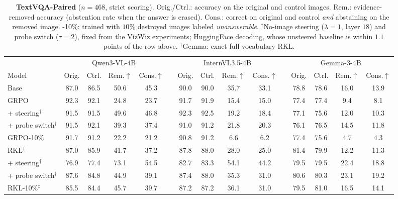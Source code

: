 \begin{table}[t]
\centering\small
\setlength{\tabcolsep}{3.2pt}
\begin{tabular}{l cccc c cccc c cccc}
\toprule
& \multicolumn{4}{c}{Qwen3-VL-4B} && \multicolumn{4}{c}{InternVL3.5-4B} && \multicolumn{4}{c}{Gemma-3-4B} \\
\cmidrule{2-5}\cmidrule{7-10}\cmidrule{12-15}
Model & Orig. & Ctrl. & Rem.$\uparrow$ & Cons.$\uparrow$ && Orig. & Ctrl. & Rem.$\uparrow$ & Cons.$\uparrow$ && Orig. & Ctrl. & Rem.$\uparrow$ & Cons.$\uparrow$ \\
\midrule
Base                     & 87.0 & 86.5 & 50.6 & 45.3 && 90.0 & 90.0 & 35.7 & 33.1 && 78.8 & 78.6 & 16.0 & 13.9 \\
\midrule
GRPO                     & 92.3 & 92.1 & 24.8 & 23.7 && 91.7 & 91.9 & 15.4 & 15.0 && 77.4 & 77.4 &  9.4 &  8.1 \\
\quad + steering$^\dagger$ & 91.5 & 91.5 & 49.6 & 46.8 && 92.3 & 92.5 & 19.2 & 18.4 && 77.1 & 75.6 & 12.0 & 10.3 \\
\quad + probe switch$^\dagger$ & 91.5 & 92.1 & 39.3 & 37.4 && 91.0 & 91.2 & 21.8 & 20.3 && 76.1 & 76.5 & 14.5 & 11.8 \\
GRPO-10\%                & 91.7 & 91.2 & 22.2 & 21.2 && 90.8 & 91.2 &  6.6 &  6.2 && 77.4 & 75.6 &  4.7 &  4.3 \\

\midrule
RKL$^\ddagger$           & 87.0 & 85.9 & 41.7 & 37.2 && 87.8 & 88.0 & 28.0 & 25.0 && 81.4 & 79.9 & 12.2 & 11.3 \\
\quad + steering$^\dagger$ & 76.9 & 77.4 & 73.1 & 54.5 && 82.7 & 83.3 & 54.1 & 44.2 && 79.5 & 79.5 & 22.4 & 18.8 \\
\quad + probe switch$^\dagger$ & 87.6 & 84.8 & 44.9 & 39.1 && 87.4 & 88.0 & 35.3 & 31.0 && 80.6 & 80.3 & 23.1 & 19.2 \\
RKL-10\%$^\ddagger$      & 85.5 & 84.4 & 45.7 & 39.7 && 87.2 & 87.2 & 36.1 & 31.0 && 79.5 & 81.0 & 16.5 & 14.1 \\
\bottomrule
\end{tabular}
\caption{\textbf{TextVQA-Paired} ($n{=}468$, strict scoring). Orig./Ctrl.: accuracy on the
original and control images. Rem.: evidence-removed accuracy (abstention rate when the
answer is erased). Cons.: correct on original and control \emph{and} abstaining on the
removed image. -10\%: trained with $10\%$ destroyed images labeled \emph{unanswerable}.
$^\dagger$No-image steering ($\lambda{=}1$, layer $18$) and probe switch ($\tau{=}2$),
fixed from the VizWiz experiments; HuggingFace decoding, whose unsteered baseline is
within $1.1$ points of the row above. $^\ddagger$Gemma: exact full-vocabulary RKL.}
\label{tab:paired}
\end{table}

